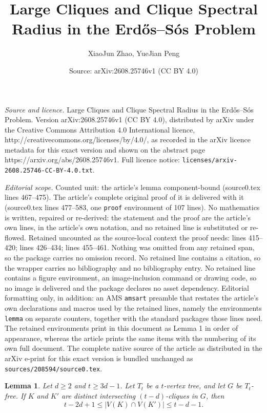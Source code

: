 \documentclass[10pt,a4paper]{amsart}
\title{Large Cliques and Clique Spectral Radius in the Erd\H{o}s--S\'{o}s Problem}
\author{XiaoJun Zhao, YueJian Peng}
\date{Source: arXiv:2608.25746v1 (CC BY 4.0)}
\newtheorem{lemma}{Lemma}
\begin{document}
\maketitle

\noindent\emph{Source and licence.} Large Cliques and Clique Spectral Radius in the Erd\H{o}s--S\'{o}s Problem. Version arXiv:2608.25746v1 (CC BY 4.0), distributed by arXiv under the Creative Commons Attribution 4.0 International licence, http://creativecommons.org/licenses/by/4.0/, as recorded in the arXiv licence metadata for this exact version and shown on the abstract page https://arxiv.org/abs/2608.25746v1. Full licence notice: \texttt{licenses/arxiv-2608.25746-CC-BY-4.0.txt}.\par\smallskip

\noindent\textit{Editorial scope.} Counted unit: the article's lemma component-bound (source0.tex lines 467--475). The article's complete original proof of it is delivered with it (source0.tex lines 477--583, one \texttt{proof} environment of 107 lines). No mathematics is written, repaired or re-derived: the statement and the proof are the article's own lines, in the article's own notation, and no retained line is substituted or re-flowed.  Retained uncounted as the source-local context the proof needs: lines 415--420; lines 426--434; lines 455--461.  Nothing was omitted from any retained span, so the package carries no omission record.  No retained line contains a citation, so the wrapper carries no bibliography and no bibliography entry.  No retained line contains a figure environment, an image-inclusion command or drawing code, so no image is delivered and the package declares no asset dependency.  Editorial formatting only, in addition: an AMS \texttt{amsart} preamble that restates the article's own declarations and macros used by the retained lines, namely the environments \texttt{lemma} on separate counters, together with the standard packages those lines need.  The retained environments print in this document as Lemma 1 in order of appearance, whereas the article prints the same items with the numbering of its own full document.  The complete native source of the article as distributed in the arXiv e-print for this exact version is bundled unchanged as \texttt{sources/208594/source0.tex}.
\begin{lemma}\label{large-overlap}
Let \(d\ge2\) and \(t\ge 3d-1\). Let \(T_t\) be a \(t\)-vertex tree, and let \(G\) be \(T_t\)-free. If \(K\) and \(K'\) are distinct intersecting \((t-d)\)-cliques in \(G\), then
\[
t-2d+1\le |V(K)\cap V(K')|\le t-d-1.
\]
\end{lemma}
\end{document}
